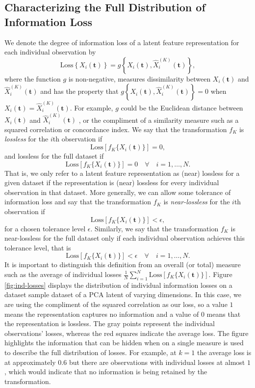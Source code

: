 \subsection{Characterizing the Full Distribution of Information Loss}\label{sec:characterising-information-loss}

We denote the degree of information loss of a latent feature representation for each individual observation by 
$$
\text{Loss} \left\{ X_i(\mathbf{t}) \right\} 
= g\left\{ X_i(\mathbf{t}), \widehat{X}_i^{(K)}(\mathbf{t}) \right\},
$$
where the function $g$ is non-negative, measures dissimilarity between $X_i(\mathbf{t})$ and $\widehat{X}_i^{(K)}(\mathbf{t})$ and has the property that $g\left\{ X_i(\mathbf{t}), \widehat{X}_i^{(K)}(\mathbf{t}) \right\}=0$ when $X_i(\mathbf{t})=\widehat{X}_i^{(K)}(\mathbf{t})$.
For example, $g$ could be the Euclidean distance between $X_i(\mathbf{t})$ and $\widehat{X}_i^{(K)}(\mathbf{t})$ \parencite{morris_comparison_2017}, or the compliment of a similarity measure such as a squared correlation or concordance index.
We say that the transformation $f_K$ is \emph{lossless} for the $i$th observation if
$$
\text{Loss} \left[ f_K\{X_i(\mathbf{t})\} \right] = 0,
$$
and lossless for the full dataset if
$$
\text{Loss} \left[ f_K\{X_i(\mathbf{t})\} \right] = 0 \quad \forall \quad  i = 1, \dots, N.
$$
That is, we only refer to a latent feature representation as (near) lossless for a given dataset if the representation is (near) lossless for every individual observation in that dataset.
More generally, we can allow some tolerance of information loss and say that
the transformation $f_K$ is \emph{near-lossless} for the $i$th observation if
$$
\text{Loss} \left[ f_K\{X_i(\mathbf{t})\} \right] < \epsilon,
$$
for a chosen tolerance level $\epsilon$. 
Similarly, we say that the transformation $f_K$ is near-lossless for the full dataset only if each individual observation achieves this tolerance level, that is
$$
\text{Loss} \left[ f_K\{X_i(\mathbf{t})\} \right] < \epsilon \quad \forall \quad  i = 1, \dots, N.
$$
It is important to distinguish this definition from an overall (or total) measure such as the average of individual losses $\frac{1}{N}\sum_{i=1}^N \text{Loss} \left[ f_K\{X_i(\mathbf{t})\} \right]$.
Figure \ref{fig:ind-losses} displays the distribution of individual information losses on a dataset sample dataset of a PCA latent of varying dimensions.
In this case, we are using the compliment of the squared correlation as our loss, so a value $1$ means the representation captures no information and a value of $0$ means that the representation is lossless.
The gray points represent the individual observations' losses, whereas the red squares indicate the average loss.
The figure highlights the information that can be hidden when on a single measure is used to describe the full distribution of losses. For example, at $k = 1$ the average loss is at approximately $0.6$ but there are observations with individual losses at almost $1$, which would indicate that no information is being retained by the transformation.


